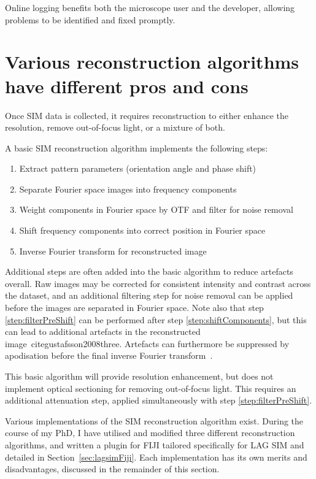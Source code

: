 Online logging benefits both the microscope user and the developer, allowing problems to be identified and fixed promptly. 


\section{Various reconstruction algorithms have different pros and cons} \label{sec:recon}
Once SIM data is collected, it requires reconstruction to either enhance the resolution, remove out-of-focus light, or a mixture of both.

A basic SIM reconstruction algorithm implements the following steps:
\begin{enumerate}
	\item Extract pattern parameters (orientation angle and phase shift)
	\item Separate Fourier space images into frequency components
	\item \label{step:filterPreShift}Weight components in Fourier space by OTF and filter for noise removal
	\item \label{step:shiftComponents}Shift frequency components into correct position in Fourier space
	\item Inverse Fourier transform for reconstructed image
\end{enumerate}

Additional steps are often added into the basic algorithm to reduce artefacts overall. 
Raw images may be corrected for consistent intensity and contrast across the dataset, and an additional filtering step for noise removal can be applied before the images are separated in Fourier space. 
Note also that step \ref{step:filterPreShift} can be performed after step \ref{step:shiftComponents}, but this can lead to additional artefacts in the reconstructed image~cite{gustafsson2008three}. 
Artefacts can furthermore be suppressed by apodisation before the final inverse Fourier transform~\cite{gustafsson2008three}. 

This basic algorithm will provide resolution enhancement, but does not implement optical sectioning for removing out-of-focus light.
This requires an additional attenuation step, applied simultaneously with step \ref{step:filterPreShift}. 

Various implementations of the SIM reconstruction algorithm exist.
During the course of my PhD, I have utilised and modified three different reconstruction algorithms, and written a plugin for FIJI tailored specifically for LAG SIM and detailed in Section~\ref{sec:lagsimFiji}.
Each implementation has its own merits and disadvantages, discussed in the remainder of this section.

